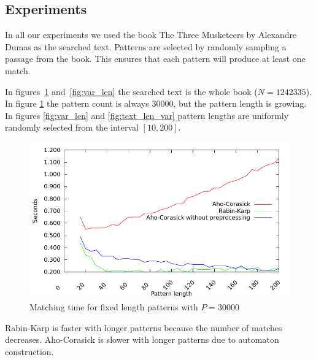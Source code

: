 \documentclass[final]{beamer}
\begin{document}
\begin{poster}
\section{Experiments}
In all our experiments we used the book The Three Musketeers by Alexandre Dumas as the
searched text.
Patterns are selected by randomly sampling a passage from the book.
This ensures that each pattern will produce at least one match.

In figures~\ref{fig:fixed_len} and~\ref{fig:var_len} the searched text is the whole book ($N=1242335$).
%
% 
In figure \ref{fig:fixed_len} the pattern count is always 30000, but the pattern length is
growing.
In figures \ref{fig:var_len} and \ref{fig:text_len_var} pattern lengths are uniformly randomly selected from the interval $[10,200]$.

\newcolumn
\begin{figure}
\centering
 \includegraphics[width=25cm]{fixed_len.pdf}
\caption{Matching time for fixed length patterns with $P=30000$}
\label{fig:fixed_len}
\end{figure}

\begin{small}
\centering
Rabin-Karp is faster with longer patterns because the number of matches decreases.
Aho-Corasick is slower with longer patterns due to automaton construction.
\end{small}


\end{poster}
\end{document}
